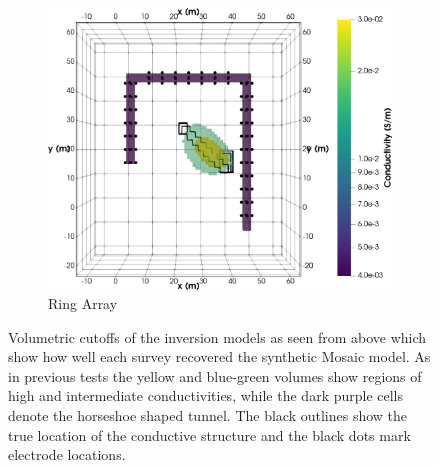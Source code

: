 \documentclass[preprint,authoryear,12pt]{elsarticle}
\begin{document}
\begin{figure}[htp]{}
\begin{center}
      \begin{subfigure}{0.48\linewidth}
         \label{fig:SynthMosaic_Horseshoe_Ring_Top}
         \includegraphics[trim=0cm 0cm 0cm 0cm, clip=true,width=\linewidth]{./figures/Fig15c.png}
         \caption{Ring Array}
      \end{subfigure}
      \vspace{0.2cm}
   \end{center}
\vspace{-0.4cm}
\caption{Volumetric cutoffs of the inversion models as seen from above which show how well each survey recovered the synthetic Mosaic model. As in previous tests the yellow and blue-green volumes show regions of high and intermediate conductivities, while the dark purple cells denote the horseshoe shaped tunnel. The black outlines show the true location of the conductive structure and the black dots mark electrode locations.}
\label{fig:Horseshoe_SynthMosaic2_Isosurfaces_Top}
\end{figure}
\end{document}
